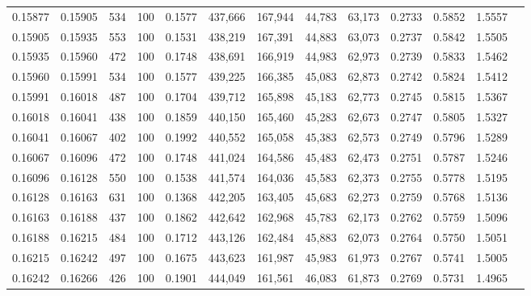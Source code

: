 \begin{tabular}{rrrrrrrrrrrrr}
0.15877 & 0.15905 &   534 & 100 &                                     0.1577 & 437,666 & 167,944 &  44,783 &  63,173 & 0.2733 & 0.5852 & 1.5557 \\
0.15905 & 0.15935 &   553 & 100 &                                     0.1531 & 438,219 & 167,391 &  44,883 &  63,073 & 0.2737 & 0.5842 & 1.5505 \\
0.15935 & 0.15960 &   472 & 100 &                                     0.1748 & 438,691 & 166,919 &  44,983 &  62,973 & 0.2739 & 0.5833 & 1.5462 \\
0.15960 & 0.15991 &   534 & 100 &                                     0.1577 & 439,225 & 166,385 &  45,083 &  62,873 & 0.2742 & 0.5824 & 1.5412 \\
0.15991 & 0.16018 &   487 & 100 &                                     0.1704 & 439,712 & 165,898 &  45,183 &  62,773 & 0.2745 & 0.5815 & 1.5367 \\
0.16018 & 0.16041 &   438 & 100 &                                     0.1859 & 440,150 & 165,460 &  45,283 &  62,673 & 0.2747 & 0.5805 & 1.5327 \\
0.16041 & 0.16067 &   402 & 100 &                                     0.1992 & 440,552 & 165,058 &  45,383 &  62,573 & 0.2749 & 0.5796 & 1.5289 \\
0.16067 & 0.16096 &   472 & 100 &                                     0.1748 & 441,024 & 164,586 &  45,483 &  62,473 & 0.2751 & 0.5787 & 1.5246 \\
0.16096 & 0.16128 &   550 & 100 &                                     0.1538 & 441,574 & 164,036 &  45,583 &  62,373 & 0.2755 & 0.5778 & 1.5195 \\
0.16128 & 0.16163 &   631 & 100 &                                     0.1368 & 442,205 & 163,405 &  45,683 &  62,273 & 0.2759 & 0.5768 & 1.5136 \\
0.16163 & 0.16188 &   437 & 100 &                                     0.1862 & 442,642 & 162,968 &  45,783 &  62,173 & 0.2762 & 0.5759 & 1.5096 \\
0.16188 & 0.16215 &   484 & 100 &                                     0.1712 & 443,126 & 162,484 &  45,883 &  62,073 & 0.2764 & 0.5750 & 1.5051 \\
0.16215 & 0.16242 &   497 & 100 &                                     0.1675 & 443,623 & 161,987 &  45,983 &  61,973 & 0.2767 & 0.5741 & 1.5005 \\
0.16242 & 0.16266 &   426 & 100 &                                     0.1901 & 444,049 & 161,561 &  46,083 &  61,873 & 0.2769 & 0.5731 & 1.4965 \\

\end{tabular}
